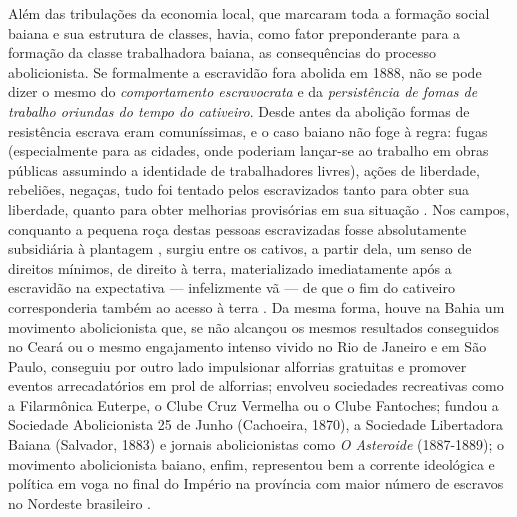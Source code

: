 Além das tribulações da economia local, que marcaram toda a formação social baiana e sua estrutura de classes, havia, como fator preponderante para a formação da classe trabalhadora baiana, as consequências do processo abolicionista. Se formalmente a escravidão fora abolida em 1888, não se pode dizer o mesmo do \textit{comportamento escravocrata} e da \textit{persistência de fomas de trabalho oriundas do tempo do cativeiro}. Desde antes da abolição formas de resistência escrava eram comuníssimas, e o caso baiano não foge à regra: fugas (especialmente para as cidades, onde poderiam lançar-se ao trabalho em obras públicas assumindo a identidade de trabalhadores livres), ações de liberdade, rebeliões, negaças, tudo foi tentado pelos escravizados tanto para obter sua liberdade, quanto para obter melhorias provisórias em sua situação \cite[p.~45-52]{fraga_encruzilhadas_2014}. Nos campos, conquanto a pequena roça destas pessoas escravizadas fosse absolutamente subsidiária à plantagem \cite{gorender_escracolo_2010}, surgiu entre os cativos, a partir dela, um senso de direitos mínimos, de direito à terra, materializado imediatamente após a escravidão na expectativa --- infelizmente vã --- de que o fim do cativeiro corresponderia também ao acesso à terra \cite{fraga_encruzilhadas_2014}. Da mesma forma, houve na Bahia um movimento abolicionista que, se não alcançou os mesmos resultados conseguidos no Ceará ou o mesmo engajamento intenso vivido no Rio de Janeiro e em São Paulo, conseguiu por outro lado impulsionar alforrias gratuitas e promover eventos arrecadatórios em prol de alforrias; envolveu sociedades recreativas como a Filarmônica Euterpe, o Clube Cruz Vermelha ou o Clube Fantoches; fundou a Sociedade Abolicionista 25 de Junho (Cachoeira, 1870), a Sociedade Libertadora Baiana (Salvador, 1883) e jornais abolicionistas como \textit{O Asteroide} (1887-1889); o movimento abolicionista baiano, enfim, representou bem a corrente ideológica e política em voga no final do Império na província com maior número de escravos no Nordeste brasileiro \cite{brito2003abolicao}.

